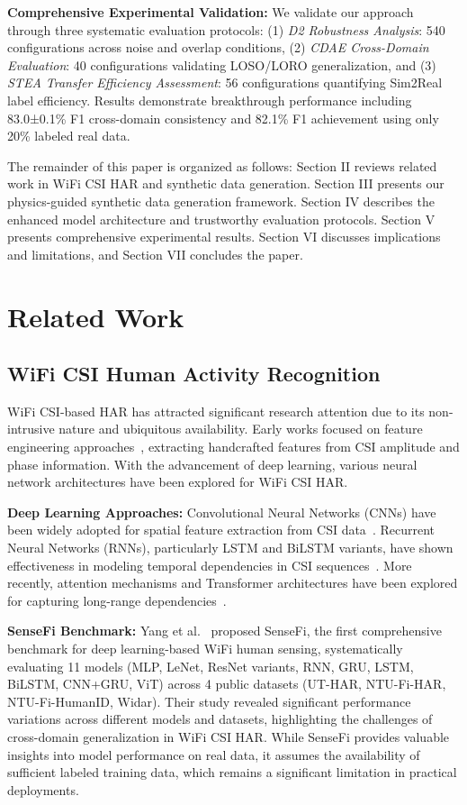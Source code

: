 \documentclass[journal]{IEEEtran}
\begin{document}
\textbf{Comprehensive Experimental Validation:} We validate our approach through three systematic evaluation protocols: (1) \textit{D2 Robustness Analysis}: 540 configurations across noise and overlap conditions, (2) \textit{CDAE Cross-Domain Evaluation}: 40 configurations validating LOSO/LORO generalization, and (3) \textit{STEA Transfer Efficiency Assessment}: 56 configurations quantifying Sim2Real label efficiency. Results demonstrate breakthrough performance including 83.0±0.1\% F1 cross-domain consistency and 82.1\% F1 achievement using only 20\% labeled real data.

The remainder of this paper is organized as follows: Section II reviews related work in WiFi CSI HAR and synthetic data generation. Section III presents our physics-guided synthetic data generation framework. Section IV describes the enhanced model architecture and trustworthy evaluation protocols. Section V presents comprehensive experimental results. Section VI discusses implications and limitations, and Section VII concludes the paper.

\section{Related Work}

\subsection{WiFi CSI Human Activity Recognition}

WiFi CSI-based HAR has attracted significant research attention due to its non-intrusive nature and ubiquitous availability. Early works focused on feature engineering approaches~\cite{csi_basics2016}, extracting handcrafted features from CSI amplitude and phase information. With the advancement of deep learning, various neural network architectures have been explored for WiFi CSI HAR.

\textbf{Deep Learning Approaches:} Convolutional Neural Networks (CNNs) have been widely adopted for spatial feature extraction from CSI data~\cite{clnet2021}. Recurrent Neural Networks (RNNs), particularly LSTM and BiLSTM variants, have shown effectiveness in modeling temporal dependencies in CSI sequences~\cite{rewis2022}. More recently, attention mechanisms and Transformer architectures have been explored for capturing long-range dependencies~\cite{autofi2022}.

\textbf{SenseFi Benchmark:} Yang et al.~\cite{yang2023sensefi} proposed SenseFi, the first comprehensive benchmark for deep learning-based WiFi human sensing, systematically evaluating 11 models (MLP, LeNet, ResNet variants, RNN, GRU, LSTM, BiLSTM, CNN+GRU, ViT) across 4 public datasets (UT-HAR, NTU-Fi-HAR, NTU-Fi-HumanID, Widar). Their study revealed significant performance variations across different models and datasets, highlighting the challenges of cross-domain generalization in WiFi CSI HAR. While SenseFi provides valuable insights into model performance on real data, it assumes the availability of sufficient labeled training data, which remains a significant limitation in practical deployments.
\end{document}
